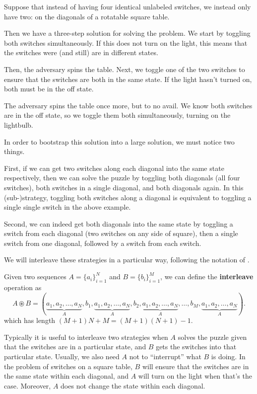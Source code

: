 \begin{example}
  Suppose that instead of having four identical unlabeled switches, we instead
  only have two: on the diagonals of a rotatable square table.

  Then we have a three-step solution for solving the problem. We start by
  toggling both switches simultaneously. If this does not turn on the light,
  this means that the switches were (and still) are in different states.

  Then, the adversary spins the table. Next, we toggle one of the two switches
  to ensure that the switches are both in the same state. If the light hasn't
  turned on, both must be in the off state.

  The adversary spins the table once more, but to no avail. We know both
  switches are in the off state, so we toggle them both simultaneously, turning
  on the lightbulb.
\end{example}

In order to bootstrap this solution into a large solution, we must notice two
things.

First, if we can get two switches along each diagonal into the same state
respectively, then we can solve the puzzle by toggling both diagonals
(all four switches), both switches in a single diagonal, and both diagonals
again. In this (sub-)strategy, toggling both switches along a diagonal is
equivalent to toggling a single single switch in the above example.

Second, we can indeed get both diagonals into the same state by toggling a
switch from each diagonal (two switches on any side of square),
then a single switch from one diagonal,
followed by a switch from each switch.

We will interleave these strategies in a particular way, following the notation
of \cite{Rabinovich2022}.

\begin{definition}
  Given two sequences $A = \{a_i\}_{i=1}^N$ and $B = \{b_i\}_{i=1}^M$, we can
  define the \textbf{interleave} operation as \[
    A \circledast B = (
      \underbrace{a_1, a_2, \dots, a_N}_A,
      b_1,
      \underbrace{a_1, a_2, \dots, a_N}_A,
      b_2,
      \underbrace{a_1, a_2, \dots, a_N}_A,
      \dots,
      b_M,
      \underbrace{a_1, a_2, \dots, a_N}_A).
  \] which has length $(M+1)N + M = (M+1)(N+1)-1$.
\end{definition}

Typically it is useful to interleave two strategies when
$A$ solves the puzzle given that the switches are in a particular state, and
$B$ gets the switches into that particular state.
Usually, we also need $A$ not to ``interrupt'' what $B$ is doing.
In the problem of switches on a square table,
$B$ will ensure that the switches are in the same state within each diagonal,
and $A$ will turn on the light when that's the case.
Moreover, $A$ does not change the state within each diagonal.

